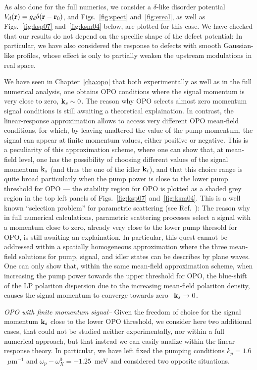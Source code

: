 \begin{subappendices}
As also done for the full numerics, we consider a $\delta$-like
disorder potential $V_d(\mathbf{r}) = g_d \delta(\mathbf{r} - \mathbf{r}_0)$, and
Figs.~\ref{fig:spect} and~\ref{fig:ereal}, as well as
Figs.~\ref{fig:ksp07} and~\ref{fig:ksm04} below, are plotted for this
case.
%
We have checked that our results do not depend on the specific shape
of the defect potential: In particular, we have also considered the
response to defects with smooth Gaussian-like profiles, whose effect
is only to partially weaken the upstream modulations in real space.

We have seen in Chapter~\ref{cha:opo} that both experimentally as well
as in the full numerical analysis, one obtains OPO conditions where
the signal momentum is very close to zero, $\mathbf{k}_s \sim 0$. The
reason why OPO selects almost zero momentum signal conditions is still
awaiting a theoretical explaination.
%
In contrast, the linear-response approximation allows to access very
different OPO mean-field conditions, for which, by leaving unaltered
the value of the pump momentum, the signal can appear at finite
momentum values, either positive or negative.
%
This is a peculiarity of this approximation scheme, where one can show
that, at mean-field level, one has the possibility of choosing
different values of the signal momentum $\mathbf{k}_s$ (and thus the one
of the idler $\mathbf{k}_i$), and that this choice range is quite broad
particularly when the pump power is close to the lower pump threshold
for OPO --- the stability region for OPO is plotted as a shaded grey
region in the top left panels of Figs.~\ref{fig:ksp07}
and~\ref{fig:ksm04}. This is a well known ``selection problem'' for
parametric scattering (see Ref.~\cite{Wouters_2007_b}): The reason why
in full numerical calculations, parametric scattering processes select
a signal with a momentum close to zero, already very close to the
lower pump thresold for OPO, is still awaiting an explaination. In
particular, this quest cannot be addressed within a spatially
homogeneous approximation where the three mean-field solutions for
pump, signal, and idler states can be describes by plane waves.
One can only show that, within the same mean-field approximation
scheme, when increasing the pump power towards the upper threshold for
OPO, the blue-shift of the LP polariton dispersion due to the
increasing mean-field polariton density, causes the signal momentum to
converge towards zero~\cite{Whittaker_2005} $\mathbf{k}_s \rightarrow 0$.

{\em{OPO with finite momentum signal--}} Given the freedom of choice for
the signal momentum $\mathbf{k}_s$ close to the lower OPO threshold, we
consider here two additional cases, that could not be studied neither
experimentally, nor within a full numerical approach, but that instead
we can easily analize within the linear-response theory.
%
In particular, we have left fixed the pumping conditions
$k_p=1.6$~$\mu$m$^{-1}$ and $\omega_p-\omega_X^0=-1.25$~meV and
considered two opposite situations.


\end{subappendices}
